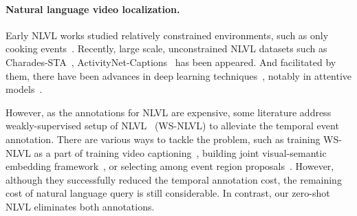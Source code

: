 \paragraph{Natural language video localization.}
Early NLVL works studied relatively constrained environments, such as only cooking events~\cite{DBLP:journals/tacl/RegneriRWTSP13}.
Recently, large scale, unconstrained NLVL datasets such as Charades-STA~\cite{gao2017tall}, ActivityNet-Captions~\cite{anetcap} has been appeared. And facilitated by them, there have been advances in deep learning techniques~\cite{gao2017tall,debug,Zhang_2019_CVPR,DBLP:conf/aaai/Chen0CJL19,DRN2020CVPR}, notably in attentive models~\cite{opazo2019proposal,mun2020LGI,opazo2021dori}.

However, as the annotations for NLVL are expensive, some literature address weakly-supervised setup of NLVL~\cite{tga,wsdec,wslln,scn} (WS-NLVL) to alleviate the temporal event annotation. 
There are various ways to tackle the problem, such as training WS-NLVL as a part of training video captioning~\cite{wsdec}, building joint visual-semantic embedding framework~\cite{tga}, or selecting among event region proposals~\cite{wslln,scn}.
However, although they successfully reduced the temporal annotation cost, the remaining cost of natural language query is still considerable. In contrast, our zero-shot NLVL eliminates both annotations.%


